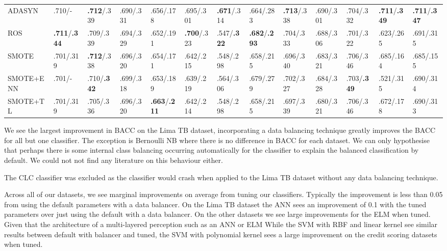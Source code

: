 \documentclass{sig-alternate-05-2015}
\begin{document}
\begin{table}
{\begin{tabular}{l|l|l|l|l|l|l|l|l|l|l|l|l}
				ADASYN&.710/-&\textbf{.712}/.339&.690/.331&.656/.178&.695/.301&\textbf{.671}/.314&.664/.283&\textbf{.713}/.338&.690/.301&.704/.332&\textbf{.711}/\textbf{.349}&\textbf{.711}/\textbf{.347}\\ 
				ROS&\textbf{.711}/\textbf{.344}&.709/.339&.694/.329&.652/.191&\textbf{.700}/.323&.547/\textbf{.322}&\textbf{.682}/\textbf{.293}&.704/.333&.688/.306&.701/.322&.623/.265&.691/.315\\
				SMOTE&.701/.319&\textbf{.712}/.338&.696/.320&.654/.171&.642/.215&.548/.298&.658/.215&.696/.340&.683/.321&.706/.346&.685/.164&.685/.155\\ 
				SMOTE+ENN&.701/-&.710/\textbf{.342}&.699/.318&.653/.189&.639/.219&.564/.306&.679/.279&.702/.327&.684/.328&.703/\textbf{.349}&.521/.315&.690/.314\\ 
				SMOTE+TL&.701/.319&.705/.336&.696/.320&\textbf{.663}/\textbf{.211}&.642/.214&.548/.298&.658/.215&.697/.339&.680/.321&.706/.346&.672/.178&.690/.313\\
				\hline				
		\end{tabular}}
		\vspace{0em}
	\end{table}	
	
	We see the largest improvement in BACC on the Lima TB dataset, incorporating a data balancing technique greatly improves the BACC for all but one classifier. The exception is Bernoulli NB where there is no difference in BACC for each dataset. We can only hypothesise that perhaps there is some internal class balancing occurring automatically for the classifier to explain the balanced classification by default. We could not not find any literature on this behaviour either.
	
	The CLC classifier was excluded as the classifier would crash when applied to the Lima TB dataset without any data balancing technique.
	
	Across all of our datasets, we see marginal improvements on average from tuning our classifiers. Typically the improvement is less than 0.05 from using the default parameters with a data balancer. On the Lima TB dataset the ANN sees an improvement of 0.1 with the tuned parameters over just using the default with a data balancer. On the other datasets we see large improvements for the ELM when tuned. Given that the architecture of a multi-layered perception such as an ANN or ELM  While the SVM with RBF and linear kernel see similar results between default with balancer and tuned, the SVM with polynomial kernel sees a large improvement on the credit scoring datasets when tuned.
	
\end{document}
